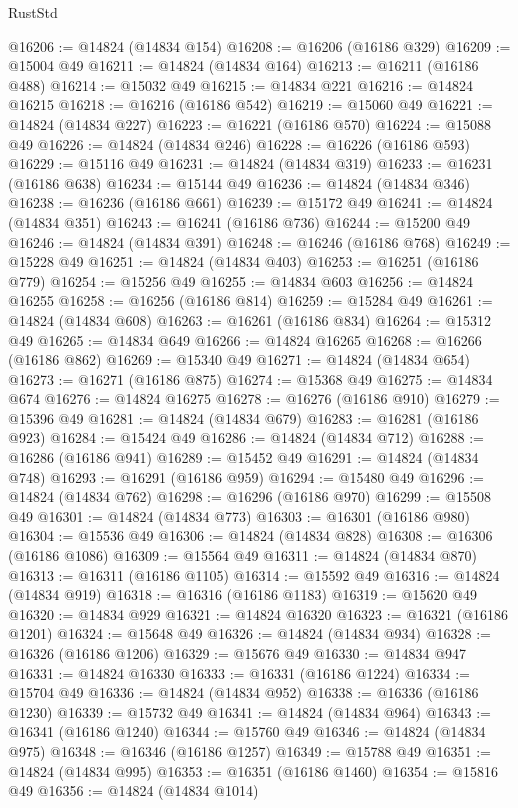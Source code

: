 \begin{lexlean}{RustStd}
\begin{coremodule}
@16206 := @14824 (@14834 @154)
@16208 := @16206 (@16186 @329)
@16209 := @15004 @49
@16211 := @14824 (@14834 @164)
@16213 := @16211 (@16186 @488)
@16214 := @15032 @49
@16215 := @14834 @221
@16216 := @14824 @16215
@16218 := @16216 (@16186 @542)
@16219 := @15060 @49
@16221 := @14824 (@14834 @227)
@16223 := @16221 (@16186 @570)
@16224 := @15088 @49
@16226 := @14824 (@14834 @246)
@16228 := @16226 (@16186 @593)
@16229 := @15116 @49
@16231 := @14824 (@14834 @319)
@16233 := @16231 (@16186 @638)
@16234 := @15144 @49
@16236 := @14824 (@14834 @346)
@16238 := @16236 (@16186 @661)
@16239 := @15172 @49
@16241 := @14824 (@14834 @351)
@16243 := @16241 (@16186 @736)
@16244 := @15200 @49
@16246 := @14824 (@14834 @391)
@16248 := @16246 (@16186 @768)
@16249 := @15228 @49
@16251 := @14824 (@14834 @403)
@16253 := @16251 (@16186 @779)
@16254 := @15256 @49
@16255 := @14834 @603
@16256 := @14824 @16255
@16258 := @16256 (@16186 @814)
@16259 := @15284 @49
@16261 := @14824 (@14834 @608)
@16263 := @16261 (@16186 @834)
@16264 := @15312 @49
@16265 := @14834 @649
@16266 := @14824 @16265
@16268 := @16266 (@16186 @862)
@16269 := @15340 @49
@16271 := @14824 (@14834 @654)
@16273 := @16271 (@16186 @875)
@16274 := @15368 @49
@16275 := @14834 @674
@16276 := @14824 @16275
@16278 := @16276 (@16186 @910)
@16279 := @15396 @49
@16281 := @14824 (@14834 @679)
@16283 := @16281 (@16186 @923)
@16284 := @15424 @49
@16286 := @14824 (@14834 @712)
@16288 := @16286 (@16186 @941)
@16289 := @15452 @49
@16291 := @14824 (@14834 @748)
@16293 := @16291 (@16186 @959)
@16294 := @15480 @49
@16296 := @14824 (@14834 @762)
@16298 := @16296 (@16186 @970)
@16299 := @15508 @49
@16301 := @14824 (@14834 @773)
@16303 := @16301 (@16186 @980)
@16304 := @15536 @49
@16306 := @14824 (@14834 @828)
@16308 := @16306 (@16186 @1086)
@16309 := @15564 @49
@16311 := @14824 (@14834 @870)
@16313 := @16311 (@16186 @1105)
@16314 := @15592 @49
@16316 := @14824 (@14834 @919)
@16318 := @16316 (@16186 @1183)
@16319 := @15620 @49
@16320 := @14834 @929
@16321 := @14824 @16320
@16323 := @16321 (@16186 @1201)
@16324 := @15648 @49
@16326 := @14824 (@14834 @934)
@16328 := @16326 (@16186 @1206)
@16329 := @15676 @49
@16330 := @14834 @947
@16331 := @14824 @16330
@16333 := @16331 (@16186 @1224)
@16334 := @15704 @49
@16336 := @14824 (@14834 @952)
@16338 := @16336 (@16186 @1230)
@16339 := @15732 @49
@16341 := @14824 (@14834 @964)
@16343 := @16341 (@16186 @1240)
@16344 := @15760 @49
@16346 := @14824 (@14834 @975)
@16348 := @16346 (@16186 @1257)
@16349 := @15788 @49
@16351 := @14824 (@14834 @995)
@16353 := @16351 (@16186 @1460)
@16354 := @15816 @49
@16356 := @14824 (@14834 @1014)

\end{coremodule}
\end{lexlean}
